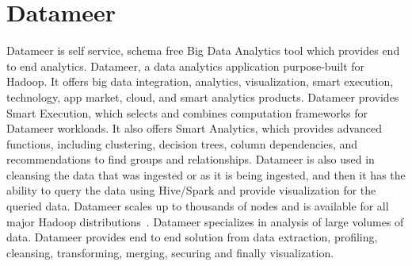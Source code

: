 \section{Datameer}

Datameer is self service, schema free Big Data Analytics tool which provides 
end to end analytics. Datameer, a data analytics application purpose-built for 
Hadoop. It offers big data integration, analytics, visualization, smart 
execution, technology, app market, cloud, and smart analytics products. 
Datameer provides Smart Execution, which selects and combines computation 
frameworks for Datameer workloads. It also offers Smart Analytics, which 
provides advanced functions, including clustering, decision trees, column 
dependencies, and recommendations to find groups and relationships. Datameer is
also used in cleansing the data that was ingested or as it is being ingested, 
and then it has the ability to query the data using Hive/Spark and provide 
visualization for the queried data. Datameer scales up to thousands of nodes
and is available for all major Hadoop distributions~\cite{hid-sp18-513-datameer}.
Datameer specializes in analysis of large volumes of data. Datameer provides 
end to end solution from data extraction, profiling, cleansing, transforming,
merging, securing and finally visualization. 

